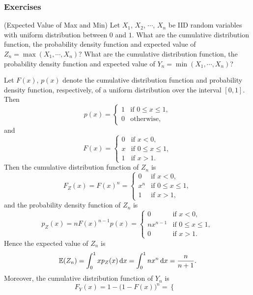 \documentclass[12pt,letterpaper, onecolumn]{exam}
\begin{document}
    \subsubsection{Exercises}
    \begin{questions}
        \question[](Expected Value of Max and Min) Let $X_1$, $X_2$, $\cdots$, $X_n$ be IID random variables with uniform distribution between $0$ and $1$. What are the cumulative distribution function, the probability density function and expected value of $Z_n=\max(X_1,\cdots,X_n)$? What are the cumulative distribution function, the probability density function and expected value of $Y_n=\min(X_1,\cdots,X_n)$?
        \begin{solution}
            Let $F(x)$, $p(x)$ denote the cumulative distribution function and probability density function, respectively, of a uniform distribution over the interval $[0,1]$. Then 
            $$p(x)=\begin{cases}
                1&\text{if $0\le x\le 1$},\\
                0&\text{otherwise},
            \end{cases}$$
            and 
            $$F(x)=\begin{cases}
                0&\text{if $x<0$},\\
                x&\text{if $0\le x\le 1$},\\
                1&\text{if $x>1$}.
            \end{cases}$$
            Then the cumulative distribution function of $Z_n$ is
            $$F_Z(x)=F(x)^n=\begin{cases}
                0&\text{if $x<0$},\\
                x^n&\text{if $0\le x\le 1$},\\
                1&\text{if $x>1$},
            \end{cases}$$
            and the probability density function of $Z_n$ is
            $$p_Z(x)=nF(x)^{n-1}p(x)=\begin{cases}
                0&\text{if $x<0$},\\
                nx^{n-1}&\text{if $0\le x\le 1$},\\
                0&\text{if $x>1$}.
            \end{cases}$$
            Hence the expected value of $Z_n$ is
            $$\mathbb{E}(Z_n)=\int_0^1xp_Z(x)\,{\rm{d}}x=\int_0^1nx^n\,{\rm{d}}x=\frac{n}{n+1}.$$
            \quad Moreover, the cumulative distribution function of $Y_n$ is
            $$F_Y(x)=1-\big(1-F(x)\big)^n=\begin{cases}

\end{cases}$$
\end{solution}
\end{questions}
\end{document}
